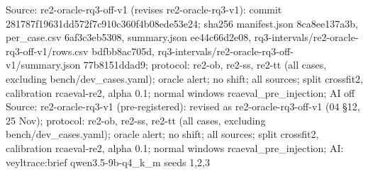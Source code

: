 \begin{table}[t]
Source: re2-oracle-rq3-off-v1 (revises re2-oracle-rq3-v1): commit 281787f19631dd572f7c910c360f4b08ede53e24; sha256 manifest.json 8ca8ee137a3b, per\_case.csv 6af3c3eb5308, summary.json ee44c66d2e08, rq3-intervals/re2-oracle-rq3-off-v1/rows.csv bdfbb8ac705d, rq3-intervals/re2-oracle-rq3-off-v1/summary.json 77b8151ddad9; protocol: re2-ob, re2-ss, re2-tt (all cases, excluding bench/dev\_cases.yaml); oracle alert; no shift; all sources; split crossfit2, calibration rcaeval-re2, alpha 0.1; normal windows rcaeval\_pre\_injection; AI off\\
Source: re2-oracle-rq3-v1 (pre-registered): revised as re2-oracle-rq3-off-v1 (04 \S{}12, 25 Nov); protocol: re2-ob, re2-ss, re2-tt (all cases, excluding bench/dev\_cases.yaml); oracle alert; no shift; all sources; split crossfit2, calibration rcaeval-re2, alpha 0.1; normal windows rcaeval\_pre\_injection; AI: veyltrace:brief qwen3.5-9b-q4\_k\_m seeds 1,2,3\\
\end{table}
